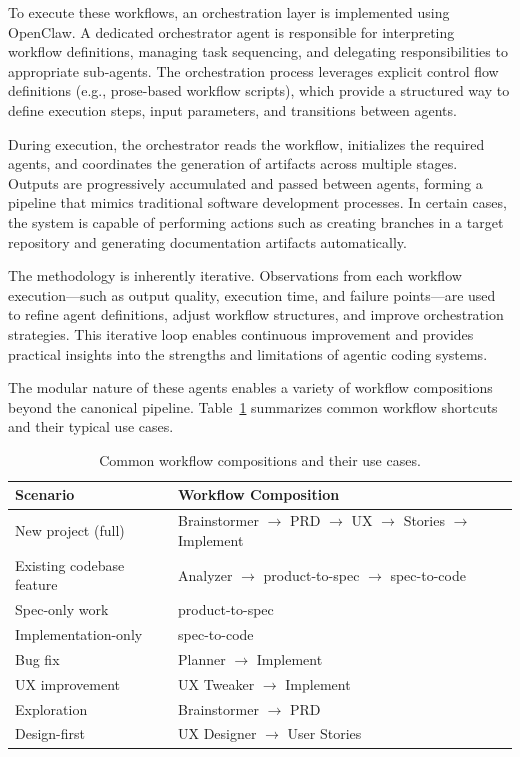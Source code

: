\documentclass[a4paper,12pt]{report}
\begin{document}
To execute these workflows, an orchestration layer is implemented using OpenClaw. A dedicated orchestrator agent is responsible for interpreting workflow definitions, managing task sequencing, and delegating responsibilities to appropriate sub-agents. The orchestration process leverages explicit control flow definitions (e.g., prose-based workflow scripts), which provide a structured way to define execution steps, input parameters, and transitions between agents.

During execution, the orchestrator reads the workflow, initializes the required agents, and coordinates the generation of artifacts across multiple stages. Outputs are progressively accumulated and passed between agents, forming a pipeline that mimics traditional software development processes. In certain cases, the system is capable of performing actions such as creating branches in a target repository and generating documentation artifacts automatically.

The methodology is inherently iterative. Observations from each workflow execution---such as output quality, execution time, and failure points---are used to refine agent definitions, adjust workflow structures, and improve orchestration strategies. This iterative loop enables continuous improvement and provides practical insights into the strengths and limitations of agentic coding systems.

The modular nature of these agents enables a variety of workflow compositions beyond the canonical pipeline. Table~\ref{table:workflowVariants} summarizes common workflow shortcuts and their typical use cases.

\begin{table}[h!]
\caption[Workflow variants]{Common workflow compositions and their use cases.}
\begin{center}
\small
\begin{tabular}{|l|l|} \hline
\textbf{Scenario} & \textbf{Workflow Composition} \\\hline
New project (full) & Brainstormer $\rightarrow$ PRD $\rightarrow$ UX $\rightarrow$ Stories $\rightarrow$ Implement \\\hline
Existing codebase feature & Analyzer $\rightarrow$ product-to-spec $\rightarrow$ spec-to-code \\\hline
Spec-only work & product-to-spec \\\hline
Implementation-only & spec-to-code \\\hline
Bug fix & Planner $\rightarrow$ Implement \\\hline
UX improvement & UX Tweaker $\rightarrow$ Implement \\\hline
Exploration & Brainstormer $\rightarrow$ PRD \\\hline
Design-first & UX Designer $\rightarrow$ User Stories \\\hline
\end{tabular}
\label{table:workflowVariants}
\end{center}
\end{table}
\end{document}
